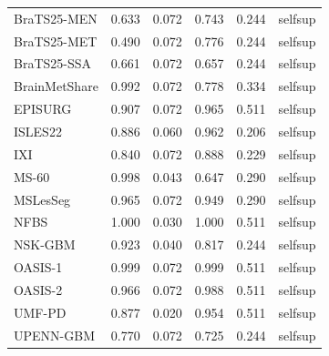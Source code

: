 \begin{tabular}{lrrrrl}
BraTS25-MEN & 0.633 & 0.072 & 0.743 & 0.244 & selfsup \\
BraTS25-MET & 0.490 & 0.072 & 0.776 & 0.244 & selfsup \\
BraTS25-SSA & 0.661 & 0.072 & 0.657 & 0.244 & selfsup \\
BrainMetShare & 0.992 & 0.072 & 0.778 & 0.334 & selfsup \\
EPISURG & 0.907 & 0.072 & 0.965 & 0.511 & selfsup \\
ISLES22 & 0.886 & 0.060 & 0.962 & 0.206 & selfsup \\
IXI & 0.840 & 0.072 & 0.888 & 0.229 & selfsup \\
MS-60 & 0.998 & 0.043 & 0.647 & 0.290 & selfsup \\
MSLesSeg & 0.965 & 0.072 & 0.949 & 0.290 & selfsup \\
NFBS & 1.000 & 0.030 & 1.000 & 0.511 & selfsup \\
NSK-GBM & 0.923 & 0.040 & 0.817 & 0.244 & selfsup \\
OASIS-1 & 0.999 & 0.072 & 0.999 & 0.511 & selfsup \\
OASIS-2 & 0.966 & 0.072 & 0.988 & 0.511 & selfsup \\
UMF-PD & 0.877 & 0.020 & 0.954 & 0.511 & selfsup \\
UPENN-GBM & 0.770 & 0.072 & 0.725 & 0.244 & selfsup \\
\bottomrule
\end{tabular}
